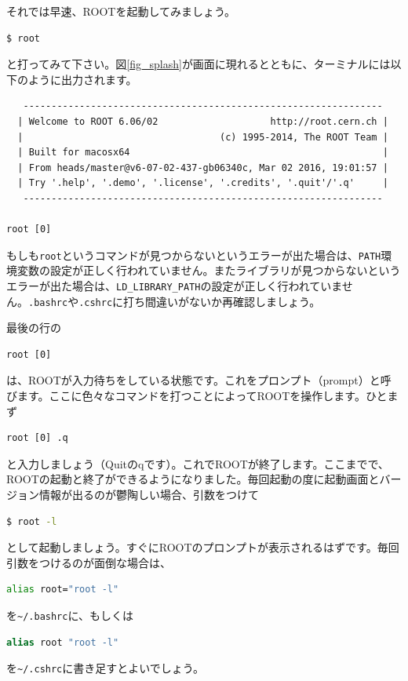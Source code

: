 それでは早速、ROOTを起動してみましょう。
\begin{lstlisting}[language=bash]
$ root
\end{lstlisting}
と打ってみて下さい。図\ref{fig_splash}が画面に現れるとともに、ターミナルには以下のように出力されます。
\begin{lstlisting}
   ----------------------------------------------------------------
  | Welcome to ROOT 6.06/02                    http://root.cern.ch |
  |                                   (c) 1995-2014, The ROOT Team |
  | Built for macosx64                                             |
  | From heads/master@v6-07-02-437-gb06340c, Mar 02 2016, 19:01:57 |
  | Try '.help', '.demo', '.license', '.credits', '.quit'/'.q'     |
   ----------------------------------------------------------------

root [0] 
\end{lstlisting}
もしも\texttt{root}というコマンドが見つからないというエラーが出た場合は、\texttt{PATH}環境変数の設定が正しく行われていません。またライブラリが見つからないというエラーが出た場合は、\texttt{LD\_LIBRARY\_PATH}の設定が正しく行われていません。\texttt{.bashrc}や\texttt{.cshrc}に打ち間違いがないか再確認しましょう。

最後の行の
\begin{lstlisting}
root [0]
\end{lstlisting}
は、ROOTが入力待ちをしている状態です。これをプロンプト（prompt）と呼びます。ここに色々なコマンドを打つことによってROOTを操作します。ひとまず
\begin{lstlisting}
root [0] .q
\end{lstlisting}
と入力しましょう（Quitのqです）。これでROOTが終了します。ここまでで、ROOTの起動と終了ができるようになりました。毎回起動の度に起動画面とバージョン情報が出るのが鬱陶しい場合、引数をつけて
\begin{lstlisting}[language=bash]
$ root -l
\end{lstlisting}
として起動しましょう。すぐにROOTのプロンプトが表示されるはずです。毎回引数をつけるのが面倒な場合は、
\begin{lstlisting}[language=bash]
alias root="root -l"
\end{lstlisting}
を\texttt{\~{}/.bashrc}に、もしくは
\begin{lstlisting}[language=csh]
alias root "root -l"
\end{lstlisting}
を\texttt{\~{}/.cshrc}に書き足すとよいでしょう。

